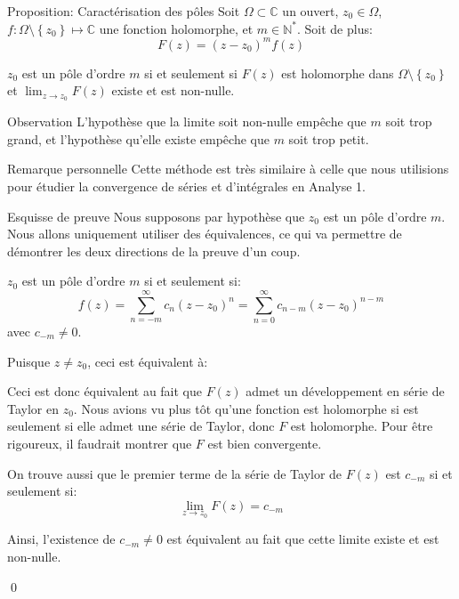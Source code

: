 \documentclass[a4paper]{article}
\begin{document}
\begin{parag}{Proposition: Caractérisation des pôles}
    Soit $\Omega \subset \mathbb{C}$ un ouvert, $z_0 \in \Omega$, $f: \Omega \setminus \left\{z_0\right\} \mapsto \mathbb{C}$ une fonction holomorphe, et $m \in \mathbb{N}^*$. Soit de plus: 
    \[F\left(z\right) = \left(z-z_0\right)^m f\left(z\right)\]
    
    $z_0$ est un pôle d'ordre $m$ si et seulement si $F\left(z\right)$ est holomorphe dans $\Omega \setminus \left\{z_0\right\}$ et $\lim_{z \to z_0} F\left(z\right)$ existe et est non-nulle.

    \begin{subparag}{Observation}
        L'hypothèse que la limite soit non-nulle empêche que $m$ soit trop grand, et l'hypothèse qu'elle existe empêche que $m$ soit trop petit.
    \end{subparag}
    
    \begin{subparag}{Remarque personnelle}
        Cette méthode est très similaire à celle que nous utilisions pour étudier la convergence de séries et d'intégrales en Analyse 1.
    \end{subparag}

    \begin{subparag}{Esquisse de preuve}
        Nous supposons par hypothèse que $z_0$ est un pôle d'ordre $m$. Nous allons uniquement utiliser des équivalences, ce qui va permettre de démontrer les deux directions de la preuve d'un coup.

        $z_0$ est un pôle d'ordre $m$ si et seulement si:
        \[f\left(z\right) = \sum_{n=-m}^{\infty} c_n \left(z-z_0\right)^n = \sum_{n=0}^{\infty} c_{n-m} \left(z-z_0\right)^{n-m}\]
        avec $c_{-m} \neq 0$.

        Puisque $z \neq z_0$, ceci est équivalent à:
        
        Ceci est donc équivalent au fait que $F\left(z\right)$ admet un développement en série de Taylor en $z_0$. Nous avions vu plus tôt qu'une fonction est holomorphe si est seulement si elle admet une série de Taylor, donc $F$ est holomorphe. Pour être rigoureux, il faudrait montrer que $F$ est bien convergente.

        On trouve aussi que le premier terme de la série de Taylor de $F\left(z\right)$ est $c_{-m}$ si et seulement si: 
        \[\lim_{z \to z_0} F\left(z\right) = c_{-m}\]
        
        Ainsi, l'existence de $c_{-m} \neq 0$ est équivalent au fait que cette limite existe et est non-nulle.

        \qed
    \end{subparag}
\end{parag}
\end{document}
